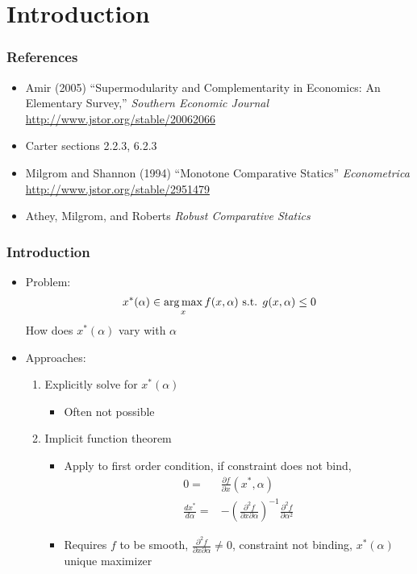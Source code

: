 \begin{frame}
  \tableofcontents  
\end{frame}

\section{Introduction} 

\begin{frame}
  \frametitle{References}
  \begin{itemize}
  \item Amir (2005) ``Supermodularity and
    Complementarity in Economics: An Elementary Survey,''
    \textit{Southern Economic Journal}
    \url{http://www.jstor.org/stable/20062066}
  \item Carter sections 2.2.3, 6.2.3
  \item Milgrom and Shannon (1994) ``Monotone Comparative Statics''
    \textit{Econometrica} \url{http://www.jstor.org/stable/2951479}
  \item Athey, Milgrom, and Roberts \textit{Robust Comparative
      Statics} 
  \end{itemize}
\end{frame}

\begin{frame}
  \frametitle{Introduction}
  \begin{itemize}
  \item Problem:
    \[ x^*(\alpha) \in \argmax_x f(x,\alpha) \text{ s.t. }
    g(x,\alpha) \leq 0 \]
    How does $x^*(\alpha)$ vary with $\alpha$
  \item Approaches:
    \begin{enumerate}
    \item Explicitly solve for $x^*(\alpha)$
      \begin{itemize}
      \item Often not possible
      \end{itemize}
    \item Implicit function theorem
      \begin{itemize}
      \item Apply to first order condition, if constraint does not
        bind,  
        \begin{align*}
          0 = & \frac{\partial f}{\partial x} (x^\ast, \alpha) \\
          \frac{d x^\ast}{d \alpha} = & -\left(\frac{\partial^2 f}{\partial
              x \partial \alpha}\right)^{-1} \frac{\partial^2 f}{\partial
            \alpha^2} 
        \end{align*}
      \item Requires $f$ to be smooth, $\frac{\partial^2 f}{\partial
          x \partial \alpha} \neq 0$, constraint not binding,
        $x^\ast(\alpha)$ unique maximizer
      \end{itemize}
    \end{enumerate}
  \end{itemize}
\end{frame}

